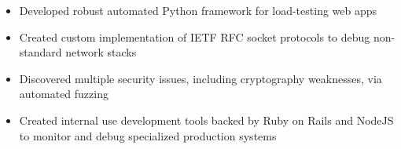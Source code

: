\documentclass[10pt,a4paper]{altacv}
\newenvironment{tightitemize} %
{\vspace{-\topsep}\begin{itemize}\itemsep1pt \parskip0pt \parsep0pt}
{\end{itemize}\vspace{-\topsep}}
\begin{document}
\divider

\vspace{\topsep} %
\begin{tightitemize}
    \item Developed robust automated Python framework for load-testing web apps
    \item Created custom implementation of IETF RFC socket protocols to debug 
        non-standard network stacks
    \item Discovered multiple security issues, including cryptography 
        weaknesses, via automated fuzzing
\end{tightitemize}

\divider

\vspace{\topsep} %
\begin{tightitemize}
\item Created internal use development tools backed by Ruby on Rails 
    and NodeJS to monitor and debug specialized production systems
\end{tightitemize}



\end{document}
